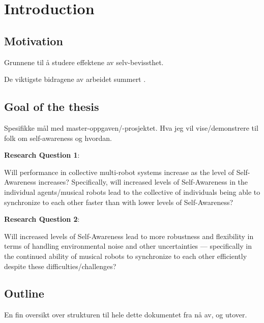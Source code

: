 \chapter{Introduction}
	
	
	
	
	
	
	
	
	\section{Motivation}
	
	Grunnene til å studere effektene av selv-bevissthet.
	\nl
	
	De viktigste bidragene av arbeidet summert .
	
	
	
	
	
	
	
	
	
	\section{Goal of the thesis}
	
	Spesifikke mål  med master-oppgaven/-prosjektet. Hva jeg vil vise/demonstrere til folk  om self-awareness  og hvordan.
	\nl
	
	\textbf{Research Question 1}:
	
	Will performance in collective multi-robot systems increase as the level of Self-Awareness increases? Specifically, will increased levels of Self-Awareness in the individual agents/musical robots lead to the collective of individuals being able to synchronize to each other faster than with lower levels of Self-Awareness? \nl
	
	\textbf{Research Question 2}:
	
	Will increased levels of Self-Awareness lead to more robustness and flexibility in terms of handling environmental noise and other uncertainties — specifically in the continued ability of musical robots to synchronize to each other efficiently despite these difficulties/challenges? \nl
	
	
	
	
	
	
	
	\section{Outline}
	En fin  oversikt over strukturen til hele dette dokumentet fra nå av, og utover.
